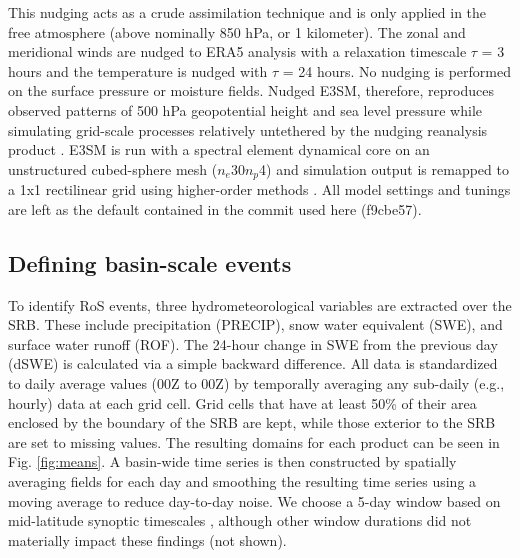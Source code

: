 \documentclass[nhess, manuscript]{copernicus}
\begin{document}
This nudging acts as a crude assimilation technique and is only applied in the free atmosphere (above nominally 850 hPa, or 1 kilometer). The zonal and meridional winds are nudged to ERA5 analysis with a relaxation timescale $\tau$ = 3 hours and the temperature is nudged with $\tau$ = 24 hours. No nudging is performed on the surface pressure or moisture fields.
Nudged E3SM, therefore, reproduces observed patterns of 500 hPa geopotential height and sea level pressure while simulating grid-scale processes relatively untethered by the nudging reanalysis product \citep{sun2019impact}.
E3SM is run with a spectral element dynamical core on an unstructured cubed-sphere mesh ($n_e$30$n_p$4) and simulation output is remapped to a 1\degree{}x1\degree{} rectilinear grid using higher-order methods \citep{hill2004architecture}. All model settings and tunings are left as the default contained in the commit used here (f9cbe57).

\subsection{Defining basin-scale events}

To identify RoS events, three hydrometeorological variables are extracted over the SRB.
These include precipitation (PRECIP), snow water equivalent (SWE), and surface water runoff (ROF).
The 24-hour change in SWE from the previous day (dSWE) is calculated via a simple backward difference.
All data is standardized to daily average values (00Z to 00Z) by temporally averaging any sub-daily (e.g., hourly) data at each grid cell.
Grid cells that have at least 50\% of their area enclosed by the boundary of the SRB are kept, while those exterior to the SRB are set to missing values.
The resulting domains for each product can be seen in Fig. \ref{fig:means}. A basin-wide time series is then constructed by spatially averaging fields for each day and smoothing the resulting time series using a moving average to reduce day-to-day noise.
We choose a 5-day window based on mid-latitude synoptic timescales \citep{holton2004introduction}, although other window durations did not materially impact these findings (not shown).
\end{document}
